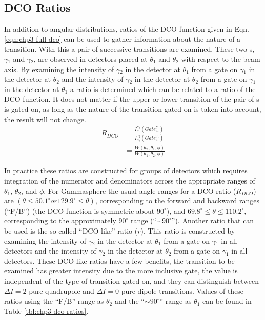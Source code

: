 \subsection{DCO Ratios}
\label{sssec:exp-pr-data-ang-cor-dco}
In addition to angular distributions, ratios of the DCO function given in Eqn. \ref{eqn:chp3-full-dco} can be used to gather information about the nature of a transition\cite{dcoRatios}. With this a pair of successive \gr{} transitions are examined. These two \gr{}s, $\gamma{}_1$ and $\gamma{}_2$, are observed in detectors placed at $\theta{}_1$ and $\theta{}_2$ with respect to the beam axis. By examining the intensity of $\gamma{}_2$ in the detector at $\theta_1$ from a gate on $\gamma{}_1$ in the detector at $\theta{}_2$ and the intensity of $\gamma{}_2$ in the detector at $\theta_2$ from a gate on $\gamma{}_1$ in the detector at $\theta{}_1$ a ratio is determined which can be related to a ratio of the DCO function. It does not matter if the upper or lower transition of the pair of \gr{}s is gated on, as long as the nature of the transition gated on is taken into account, the result will not change.
\begin{align}
R_{DCO} &= \frac{I^{\gamma{}_2}_{\theta{}_1}(Gate^{\gamma{}_1}_{\theta{}_2})}{I^{\gamma{}_2}_{\theta{}_2}(Gate^{\gamma{}_1}_{\theta{}_1})} \label{eqn:chp3:exp-dco-ratio}\\
 &= \frac{W(\theta{}_2,\theta{}_1,\phi{})}{W(\theta{}_1,\theta{}_2,\phi{})} \label{eqn:chp3:theory-dco-ratio}
\end{align}

In practice these ratios are constructed for groups of detectors which requires integration of the numerator and denominators across the appropriate ranges of $\theta{}_1$, $\theta{}_2$, and $\phi{}$. For Gammasphere the usual angle ranges for a DCO-ratio ($R_{DCO}$) are $(\theta{}\leq{}50.1^{\circ} or 129.9^{\circ}\leq{}\theta{})$, corresponding to the forward and backward ranges (``F/B'') (the DCO function is symmetric about $90^{\circ}$), and $69.8^{\circ}\leq{}\theta{}\leq{}110.2^{\circ}$, corresponding to the approximately $90^{\circ{}}$ range (``$\sim{}90^{\circ}$'').  Another ratio that can be used is the so called ``DCO-like'' ratio ($r$). This ratio is constructed by examining the intensity of $\gamma{}_2$ in the detector at $\theta_1$ from a gate on $\gamma{}_1$ in all detectors and the intensity of $\gamma{}_2$ in the detector at $\theta_2$ from a gate on $\gamma{}_1$ in all detectors. These DCO-like ratios have a few benefits, the transition to be examined has greater intensity due to the more inclusive gate, the value is independent of the type of transition gated on, and they can distinguish between $\Delta I=2$ pure quadrupole and $\Delta I=0$ pure dipole transitions. Values of these ratios using the ``F/B'' range as $\theta_2$ and the ``$\sim{}90^{\circ}$'' range as $\theta_1$ can be found in Table \ref{tbl:chp3-dco-ratios}.

